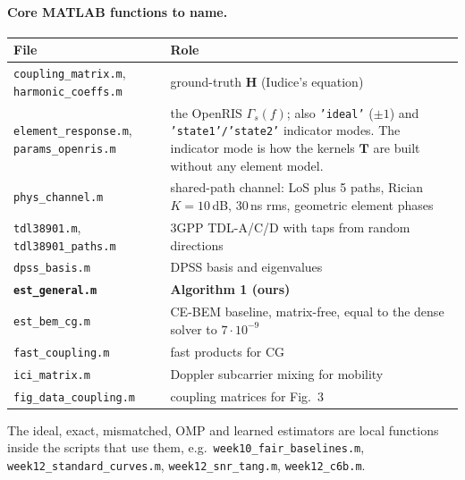 \documentclass[11pt,a4paper]{article}
\begin{document}
\paragraph{Core MATLAB functions to name.}
\begin{center}\small
\begin{tabularx}{\textwidth}{lX}
\toprule
File & Role\\
\midrule
\texttt{coupling\_matrix.m}, \texttt{harmonic\_coeffs.m} & ground-truth $\bm H$ (Iudice's equation)\\
\texttt{element\_response.m}, \texttt{params\_openris.m} & the OpenRIS $\Gamma_s(f)$; also \texttt{'ideal'} ($\pm1$) and
\texttt{'state1'/'state2'} indicator modes. The indicator mode is how the kernels $\bm T$ are built without any element model.\\
\texttt{phys\_channel.m} & shared-path channel: LoS plus 5 paths, Rician $K=10$\,dB, 30\,ns rms, geometric element phases\\
\texttt{tdl38901.m}, \texttt{tdl38901\_paths.m} & 3GPP TDL-A/C/D with taps from random directions\\
\texttt{dpss\_basis.m} & DPSS basis and eigenvalues\\
\textbf{\texttt{est\_general.m}} & \textbf{Algorithm 1 (ours)}\\
\texttt{est\_bem\_cg.m} & CE-BEM baseline, matrix-free, equal to the dense solver to $7\cdot10^{-9}$\\
\texttt{fast\_coupling.m} & fast products for CG\\
\texttt{ici\_matrix.m} & Doppler subcarrier mixing for mobility\\
\texttt{fig\_data\_coupling.m} & coupling matrices for Fig.~3\\
\bottomrule
\end{tabularx}
\end{center}
The ideal, exact, mismatched, OMP and learned estimators are local functions inside the scripts that use them, e.g.\
\texttt{week10\_fair\_baselines.m}, \texttt{week12\_standard\_curves.m}, \texttt{week12\_snr\_tang.m}, \texttt{week12\_c6b.m}.
\end{document}

